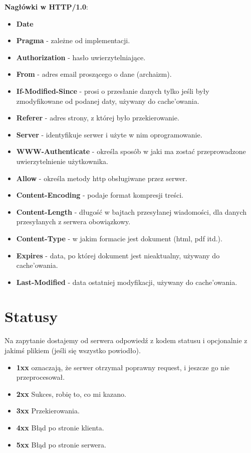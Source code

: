 \textbf{Nagłówki w HTTP/1.0}:
\begin{itemize}
	\item \textbf{Date}
	\item \textbf{Pragma} - zależne od implementacji.
	\item \textbf{Authorization} - hasło uwierzytelniające.
	\item \textbf{From} - adres email proszącego o dane (archaizm).
	\item \textbf{If-Modified-Since} - prosi o przesłanie danych tylko jeśli były zmodyfikowane od podanej daty, używany do cache'owania.
	\item \textbf{Referer} - adres strony, z której było przekierowanie.
	\item \textbf{Server} - identyfikuje serwer i użyte w nim oprogramowanie.
	\item \textbf{WWW-Authenticate} - określa sposób w jaki ma zostać przeprowadzone uwierzytelnienie użytkownika.
	\item \textbf{Allow} - określa metody http obsługiwane przez serwer.
	\item \textbf{Content-Encoding} - podaje format kompresji treści.
	\item \textbf{Content-Length} - długość w bajtach przesyłanej wiadomości, dla danych przesyłanych z serwera obowiązkowy.
	\item \textbf{Content-Type} - w jakim formacie jest dokument (html, pdf itd.).
	\item \textbf{Expires} - data, po której dokument jest nieaktualny, używany do cache'owania.
	\item \textbf{Last-Modified} - data ostatniej modyfikacji, używany do cache'owania.
\end{itemize}

\section{Statusy}
Na zapytanie dostajemy od serwera odpowiedź z kodem statusu i opcjonalnie z jakimś plikiem (jeśli się wszystko powiodło).
\begin{itemize}
	\item \textbf{1xx} oznaczają, że serwer otrzymał poprawny request, i jeszcze go nie przeprocesował.
	\item \textbf{2xx} Sukces, robię to, co mi kazano.
	\item \textbf{3xx} Przekierowania.
	\item \textbf{4xx} Błąd po stronie klienta.
	\item \textbf{5xx} Błąd po stronie serwera.
\end{itemize}

